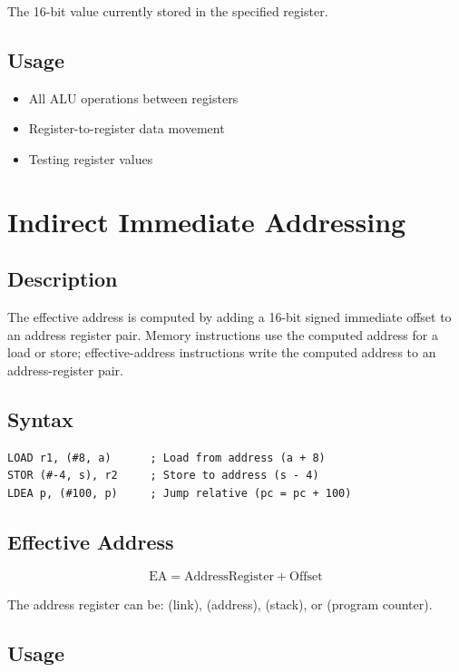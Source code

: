 The 16-bit value currently stored in the specified register.

\subsection{Usage}

\begin{itemize}
	\item All ALU operations between registers
	\item Register-to-register data movement
	\item Testing register values
\end{itemize}

\section{Indirect Immediate Addressing}

\subsection{Description}

The effective address is computed by adding a 16-bit signed immediate offset to an address register pair. Memory
instructions use the computed address for a load or store; effective-address instructions write the computed address to
an address-register pair.

\subsection{Syntax}

\begin{lstlisting}
LOAD r1, (#8, a)      ; Load from address (a + 8)
STOR (#-4, s), r2     ; Store to address (s - 4)
LDEA p, (#100, p)     ; Jump relative (pc = pc + 100)
\end{lstlisting}

\subsection{Effective Address}

\begin{equation}
	\text{EA} = \text{AddressRegister} + \text{Offset}
\end{equation}

The address register can be:  (link),  (address),  (stack), or  (program counter).

\subsection{Usage}

